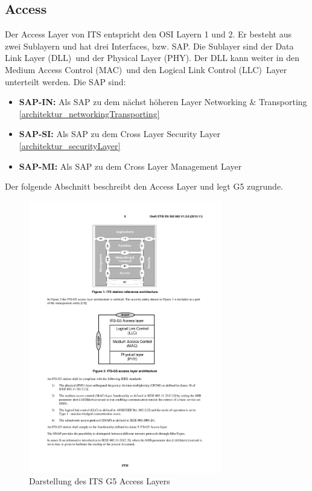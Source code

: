 \subsection{Access}
Der Access Layer von ITS entspricht den \ac{OSI} Layern 1 und 2. Er besteht aus zwei Sublayern und hat drei Interfaces, bzw. \ac{SAP}. Die Sublayer sind der \glqq Data Link Layer (DLL)\grqq~und der \glqq Physical Layer (PHY)\grqq. Der DLL kann weiter in den \glqq Medium Access Control (MAC)\grqq~und den \glqq Logical Link Control (LLC)\grqq~Layer unterteilt werden. Die \ac{SAP} sind:
\begin{itemize}
	\item \textbf{SAP-IN: } Als \ac{SAP} zu dem nächst höheren Layer  Networking \& Transporting \ref{architektur_networkingTransporting}
	\item \textbf{SAP-SI: } Als \ac{SAP} zu dem Cross Layer Security Layer \ref{architektur_securityLayer}
	\item \textbf{SAP-MI: } Als \ac{SAP} zu dem Cross Layer Management Layer \label{architektur_managementLayer}
\end{itemize}



Der folgende Abschnitt beschreibt den Access Layer und legt G5 zugrunde.
 
\begin{figure}
	\includegraphics[width=0.75\textwidth]{content/images/02_architektur/accessLayer.pdf}
	\caption{Darstellung des ITS G5 Access Layers \cite{etsi302663}}
	\label{fig:architektur_accessLayer}
\end{figure}

